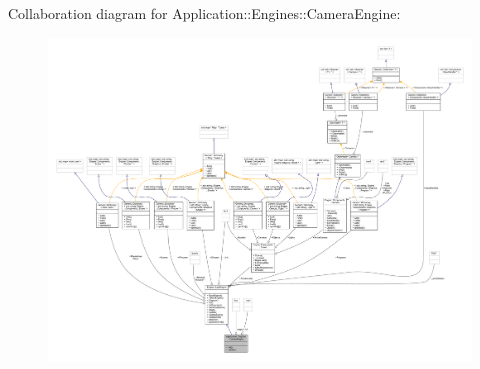 Collaboration diagram for Application\+:\+:Engines\+:\+:Camera\+Engine\+:
\nopagebreak
\begin{figure}[H]
\begin{center}
\leavevmode
\includegraphics[width=350pt]{classApplication_1_1Engines_1_1CameraEngine__coll__graph}
\end{center}
\end{figure}
